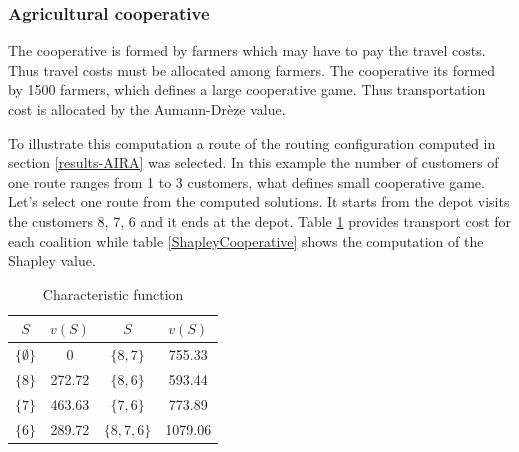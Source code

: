 \subsubsection{Agricultural cooperative}\label{CooperationAIRA}


The cooperative is formed by farmers which may have to pay the travel costs. Thus travel costs must be allocated among farmers. The cooperative its formed by 1500 farmers, which defines a large cooperative game. Thus transportation cost is allocated by the Aumann-Dr\`eze value.

To illustrate this computation a route of the routing configuration computed in section \ref{results-AIRA} was selected. In this example the number of customers of one route ranges from 1 to 3 customers, what defines small cooperative game. Let's select one route from the computed solutions. It starts from the depot visits the customers 8, 7, 6 and it ends at the depot. Table \ref{VarthetaCooperative} provides transport cost for each coalition while table \ref{ShapleyCooperative} shows the computation of the Shapley value.


\begin{table}[H]
	\centering
	\begin{tabular}{c|c|c|c}
		$S$ & $v(S)$ & $S$ & $v(S)$ \\ 
		\hline 
		$\{\emptyset\}$ & 0 & $\{8,7\}$ & 755.33 \\ 
		\hline 
		$\{8\}$ & 272.72 & $\{8,6\}$ & 593.44 \\ 
		\hline 
		$\{7\}$ & 463.63 & $\{7,6\}$ & 773.89 \\ 
		\hline 
		$\{6\}$ & 289.72 & $\{8,7,6\}$ & 1079.06 \\ 
	\end{tabular} 
	\caption{ Characteristic function}
	\label{VarthetaCooperative}
\end{table}


